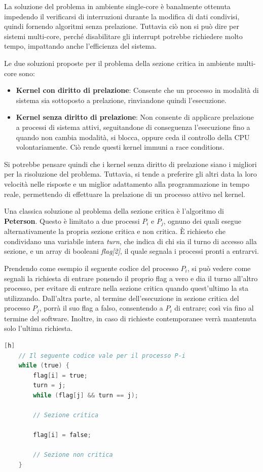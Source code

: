 \noindent La soluzione del problema in ambiente single-core è banalmente ottenuta impedendo il verificarsi di interruzioni durante la modifica di dati
condivisi, quindi fornendo algoritmi senza prelazione. Tuttavia ciò non si può dire per sistemi multi-core, perché disabilitare gli interrupt potrebbe
richiedere molto tempo, impattando anche l'efficienza del sistema.\par
Le due soluzioni proposte per il problema della sezione critica in ambiente multi-core sono: \begin{itemize}
    \item \textbf{Kernel con diritto di prelazione}: Consente che un processo in modalità di sistema sia sottoposto a prelazione, rinviandone quindi
    l'esecuzione.
    \item \textbf{Kernel senza diritto di prelazione}: Non consente di applicare prelazione a processi di sistema attivi, seguitandone di conseguenza
    l'esecuzione fino a quando non cambia modalità, si blocca, oppure ceda il controllo della CPU volontariamente. Ciò rende questi kernel immuni a
    race conditions.
\end{itemize}

\noindent Si potrebbe pensare quindi che i kernel senza diritto di prelazione siano i migliori per la risoluzione del problema. Tuttavia, si tende a
preferire gli altri data la loro velocità nelle risposte e un miglior adattamento alla programmazione in tempo reale, permettendo di effettuare la
prelazione di un processo attivo nel kernel.\par
Una classica soluzione al problema della sezione critica è l'algoritmo di \textbf{Peterson}. Questo è limitato a due processi $P_i$ e $P_j$, ognuno dei
quali esegue alternativamente la propria sezione critica e non critica. È richiesto che condividano una variabile intera \textit{turn}, che indica di
chi sia il turno di accesso alla sezione, e un array di booleani \textit{flag[2]}, il quale segnala i processi pronti a entrarvi.\par
Prendendo come esempio il seguente codice del processo $P_i$, si può vedere come segnali la richiesta di entrare ponendo il proprio flag a vero e dia
il turno all'altro processo, per evitare di entrare nella sezione critica quando quest'ultimo la sta utilizzando. Dall'altra parte, al termine
dell'esecuzione in sezione critica del processo $P_j$, porrà il suo flag a falso, consentendo a $P_i$ di entrare; così via fino al termine del software.
Inoltre, in caso di richieste contemporanee verrà mantenuta solo l'ultima richiesta.
\begin{lstlisting}[language=C][h]
    // Il seguente codice vale per il processo P-i
    while (true) {
        flag[i] = true;
        turn = j;
        while (flag[j] && turn == j);
        
        // Sezione critica

        flag[i] = false;

        // Sezione non critica
    }
\end{lstlisting}

